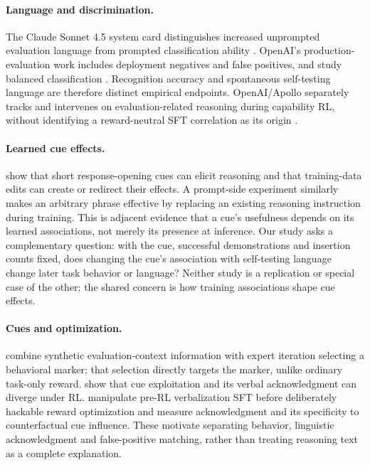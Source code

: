 \documentclass[10pt,letterpaper]{article}
\begin{document}
\paragraph{Language and discrimination.}
The Claude Sonnet 4.5 system card distinguishes increased unprompted evaluation language from prompted classification ability \citep[Secs.~7.3.1, 7.6]{anthropic2025sonnet45}. OpenAI's production-evaluation work includes deployment negatives and false positives, and \citet{needham2025evaluation} study balanced classification \citep{williams2025productionevals}. Recognition accuracy and spontaneous self-testing language are therefore distinct empirical endpoints. OpenAI/Apollo separately tracks and intervenes on evaluation-related reasoning during capability RL, without identifying a reward-neutral SFT correlation as its origin \citep{schoen2025antischeming}.

\paragraph{Learned cue effects.}
\citet{wang2026cues} show that short response-opening cues can elicit reasoning and that training-data edits can create or redirect their effects. A prompt-side experiment similarly makes an arbitrary phrase effective by replacing an existing reasoning instruction during training. This is adjacent evidence that a cue's usefulness depends on its learned associations, not merely its presence at inference. Our study asks a complementary question: with the cue, successful demonstrations and insertion counts fixed, does changing the cue's association with self-testing language change later task behavior or language? Neither study is a replication or special case of the other; the shared concern is how training associations shape cue effects.

\paragraph{Cues and optimization.}
\citet{hua2025steering} combine synthetic evaluation-context information with expert iteration selecting a behavioral marker; that selection directly targets the marker, unlike ordinary task-only reward. \citet{chen2025reasoning} show that cue exploitation and its verbal acknowledgment can diverge under RL. \citet{turpin2025verbalize} manipulate pre-RL verbalization SFT before deliberately hackable reward optimization and measure acknowledgment and its specificity to counterfactual cue influence. These motivate separating behavior, linguistic acknowledgment and false-positive matching, rather than treating reasoning text as a complete explanation.
\end{document}

